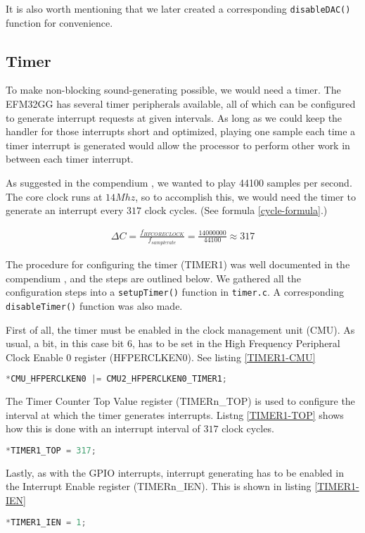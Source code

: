 It is also worth mentioning that we later created a corresponding \texttt{disableDAC()} function for convenience.

\subsection{Timer}

To make non-blocking sound-generating possible, we would need a timer. The EFM32GG has several timer peripherals available, all of which can be configured to generate interrupt requests at given intervals. As long as we could keep the handler for those interrupts short and optimized, playing one sample each time a timer interrupt is generated would allow the processor to perform other work in between each timer interrupt.

As suggested in the compendium \cite[p.~42]{compendium}, we wanted to play 44100 samples per second. The core clock runs at $14Mhz$, so to accomplish this, we would need the timer to generate an interrupt every $317$ clock cycles. (See formula \ref{cycle-formula}.)

\begin{gather}
\label{cycle-formula}
\Delta C = \frac{f_{HFCORECLOCK}}{f_{samplerate}} = \frac{14000000}{44100} \approx 317
\end{gather}

The procedure for configuring the timer (TIMER1) was well documented in the compendium \cite[p.~40]{compendium}, and the steps are outlined below. We gathered all the configuration steps into a \texttt{setupTimer()} function in \texttt{timer.c}. A corresponding \texttt{disableTimer()} function was also made.

First of all, the timer must be enabled in the clock management unit (CMU). As usual, a bit, in this case bit 6, has to be set in the High Frequency Peripheral Clock Enable 0 register (HFPERCLKEN0). See listing \ref{TIMER1-CMU}

\begin{lstlisting}[language=C, label=TIMER1-CMU, caption=Enabling the timer in the CMU]
*CMU_HFPERCLKEN0 |= CMU2_HFPERCLKEN0_TIMER1;
\end{lstlisting}

The Timer Counter Top Value register (TIMERn\_TOP) is used to configure the interval at which the timer generates interrupts. Listng \ref{TIMER1-TOP} shows how this is done with an interrupt interval of $317$ clock cycles.

\begin{lstlisting}[language=C, label=TIMER1-TOP, caption=Setting interrupt interval]
*TIMER1_TOP = 317;
\end{lstlisting}

Lastly, as with the GPIO interrupts, interrupt generating has to be enabled in the Interrupt Enable register (TIMERn\_IEN). This is shown in listing \ref{TIMER1-IEN}

\begin{lstlisting}[language=C, label=TIMER1-IEN, caption=Interrupt generation]
*TIMER1_IEN = 1;
\end{lstlisting}

